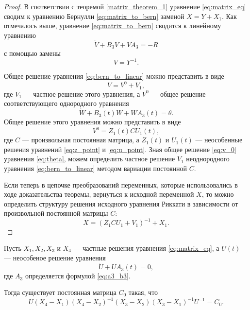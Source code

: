 \begin{proof}
    В соответствии с теоремой \ref{matrix_theorem_1} уравнение \eqref{eq:matrix_eq} сводим к уравнению Бернулли \eqref{eq:matrix_to_bern} заменой $X = Y + X_1$. Как отмечалось выше, уравнение \eqref{eq:matrix_to_bern} сводится к линейному уравнению
    \begin{equation} \label{eq:bern_to_linear}
        \dot V + B_3 V + V A_3 = - R
    \end{equation}
    с помощью замены
    \begin{equation}
        V = Y^{-1}.
    \end{equation}
    
    Общее решение уравнения \eqref{eq:bern_to_linear} можно представить в виде
    \begin{equation}
        V = V^0 + V_1,
    \end{equation}
    где $V_1$ --- частное решение этого уравнения, а $V^0$ --- общее решение соответствующего однородного уравнения
    \begin{equation} \label{eq:theta}
        \dot W + B_3(t) W + W A_3(t) = \theta.
    \end{equation}
    Общее решение этого уравнения можно представить в виде
    \begin{equation} \label{eq:v_0}
        V^0 = Z_1(t) C U_1(t),
    \end{equation}
    где $C$ --- произвольная постоянная матрица, а $Z_1(t)$ и $U_1(t)$ --- неособенные решения уравнений \eqref{eq:z_point} и \eqref{eq:u_point}. Зная общее решение \eqref{eq:v_0} уравнения \eqref{eq:theta}, можем определить частное решение $V_1$ неоднородного уравнения \eqref{eq:bern_to_linear} методом вариации постоянной $C$.

    Если теперь в цепочке преобразований переменных, которые использовались в ходе доказательства теоремы, вернуться к исходной переменной $X$, то можно определить структуру решения исходного уравнения Риккати в зависимости от произвольной постоянной матрицы $C$:
    \begin{equation} \label{eq:back_to_x}
        X = (Z_1 C U_1 + V_1)^{-1} + X_1.
    \end{equation}
\end{proof}
\begin{theorem}
    Пусть $X_1, X_2, X_3$ и $X_4$ --- частные решения уравнения \eqref{eq:matrix_eq}, а $U(t)$ --- неособеное решение уравнения
    \begin{equation}
        \dot U + U A_3(t) = 0,
    \end{equation}
    где $A_3$ определяется формулой \eqref{eq:a3_b3}.

    Тогда существует постоянная матрица $C_0$ такая, что
    \begin{equation} \label{eq:c_0}
        U(X_4 - X_1) (X_4 - X_2)^{-1}(X_3 - X_2)(X_3 - X_1)^{-1} U^{-1} = C_0.
    \end{equation}
\end{theorem}
